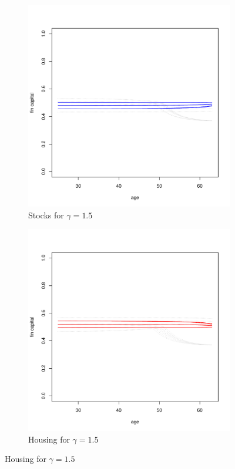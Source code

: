 \documentclass[]{elsarticle}
\begin{document}
\begin{figure}[H]
	\centering
    \begin{subfigure}{0.45\textwidth}
		\centering
		\includegraphics[scale=0.3]{figs/smunkhouse15.pdf}
		\caption{Stocks for $\gamma = 1.5$}
	\end{subfigure}
	\hfill
    \begin{subfigure}{0.45\textwidth}
		\centering
		\includegraphics[scale=0.3]{figs/hmunkhouse15.pdf}
		\caption{Housing for $\gamma = 1.5$}
	\end{subfigure}
\end{figure}
\end{document}
